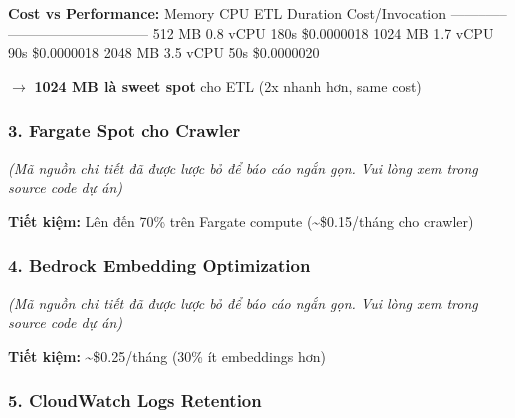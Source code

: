 \begin{Shaded}
\begin{Highlighting}[]

\end{Highlighting}
\end{Shaded}

\textbf{Cost vs Performance:} \textbar{} Memory \textbar{} CPU
\textbar{} ETL Duration \textbar{} Cost/Invocation \textbar{}
\textbar--------\textbar-----\textbar--------------\textbar-----------------\textbar{}
\textbar{} 512 MB \textbar{} 0.8 vCPU \textbar{} 180s \textbar{}
\$0.0000018 \textbar{} \textbar{} 1024 MB \textbar{} 1.7 vCPU \textbar{}
90s \textbar{} \$0.0000018 \textbar{} \textbar{} 2048 MB \textbar{} 3.5
vCPU \textbar{} 50s \textbar{} \$0.0000020 \textbar{}

\(\rightarrow\) \textbf{1024 MB là sweet spot} cho ETL (2x nhanh hơn,
same cost)

\hypertarget{fargate-spot-cho-crawler}{%
\subsubsection{3. Fargate Spot cho
Crawler}}

\emph{(Mã nguồn chi tiết đã được lược bỏ để báo cáo ngắn gọn. Vui lòng
xem trong source code dự án)}

\textbf{Tiết kiệm:} Lên đến 70\% trên Fargate compute
(\textasciitilde\$0.15/tháng cho crawler)

\hypertarget{bedrock-embedding-optimization}{%
\subsubsection{4. Bedrock Embedding
Optimization}}

\emph{(Mã nguồn chi tiết đã được lược bỏ để báo cáo ngắn gọn. Vui lòng
xem trong source code dự án)}

\textbf{Tiết kiệm:} \textasciitilde\$0.25/tháng (30\% ít embeddings hơn)

\hypertarget{cloudwatch-logs-retention}{%
\subsubsection{5. CloudWatch Logs
Retention}}

